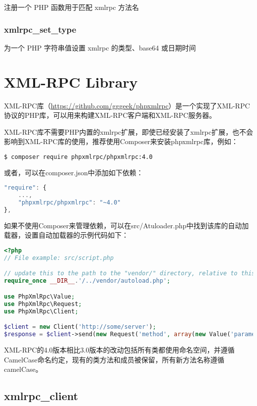 注册一个 PHP 函数用于匹配 xmlrpc 方法名

\subsection{xmlrpc\_set\_type}


为一个 PHP 字符串值设置 xmlrpc 的类型、base64 或日期时间




\chapter{XML-RPC Library}


XML-RPC库（\url{https://github.com/gggeek/phpxmlrpc}）是一个实现了XML-RPC协议的PHP库，可以用来构建XML-RPC客户端和XML-RPC服务器。

XML-RPC库不需要PHP内置的xmlrpc扩展，即使已经安装了xmlrpc扩展，也不会影响到XML-RPC库的使用，推荐使用Composer来安装phpxmlrpc库，例如：

\begin{lstlisting}[language=bash]
$ composer require phpxmlrpc/phpxmlrpc:4.0
\end{lstlisting}

或者，可以在composer.json中添加如下依赖：

\begin{lstlisting}[language=JavaScript]
"require": {
    ...,
    "phpxmlrpc/phpxmlrpc": "~4.0"
},
\end{lstlisting}

如果不使用Composer来管理依赖，可以在src/Atuloader.php中找到该库的自动加载器，设置自动加载器的示例代码如下：


\begin{lstlisting}[language=PHP]
<?php
// File example: src/script.php

// update this to the path to the "vendor/" directory, relative to this file
require_once __DIR__.'/../vendor/autoload.php';

use PhpXmlRpc\Value;
use PhpXmlRpc\Request;
use PhpXmlRpc\Client;

$client = new Client('http://some/server');
$response = $client->send(new Request('method', array(new Value('parameter'))));
\end{lstlisting}




XML-RPC的4.0版本相比3.0版本的改动包括所有类都使用命名空间，并遵循CamelCase命名约定，现有的类方法和成员被保留，所有新方法名称遵循camelCase。

\section{xmlrpc\_client}



